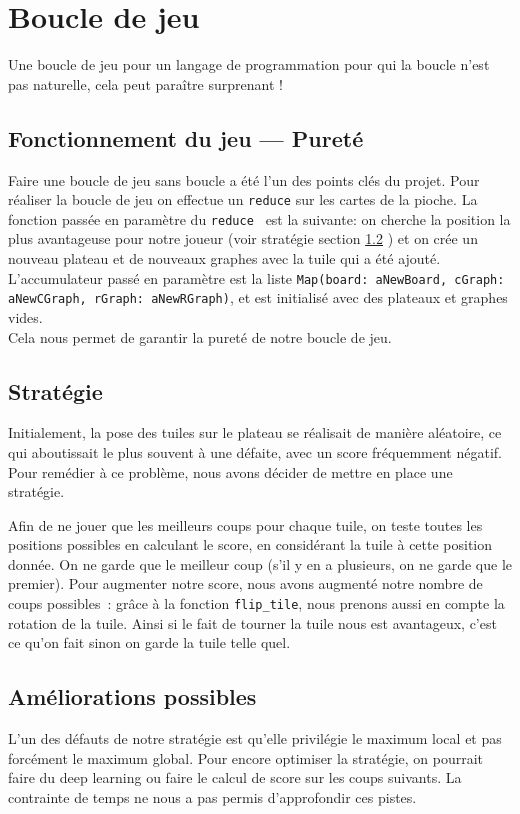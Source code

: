 \section{Boucle de jeu}
Une boucle de jeu pour un langage de programmation pour qui la boucle n'est pas naturelle, cela peut paraître surprenant !

\subsection{Fonctionnement du jeu — Pureté}
Faire une boucle de jeu sans boucle a été l'un des points clés du projet. Pour réaliser la boucle de jeu on effectue un \texttt{reduce} sur les cartes de la pioche. La fonction passée en paramètre du \texttt{reduce } est la suivante: on cherche la position la plus avantageuse pour notre joueur (voir stratégie section \ref{subsec:Strategie} ) et on crée un nouveau plateau et de nouveaux graphes avec la tuile qui a été ajouté. L'accumulateur passé en paramètre est la liste \texttt{Map(board: aNewBoard, cGraph: aNewCGraph, rGraph: aNewRGraph)}, et est initialisé avec des plateaux et graphes vides. \\
Cela nous permet de garantir la pureté de notre boucle de jeu.


\subsection{Stratégie}
\label{subsec:Strategie}
Initialement, la pose des tuiles sur le plateau se réalisait de manière aléatoire, ce qui aboutissait le plus souvent à une défaite, avec un score fréquemment négatif. Pour remédier à ce problème, nous avons décider de mettre en place une stratégie.

Afin de ne jouer que les meilleurs coups pour chaque tuile, on teste toutes les positions possibles en calculant le score, en considérant la tuile à cette position donnée. On ne garde que le meilleur coup (s'il y en a plusieurs, on ne garde que le premier). Pour augmenter notre score, nous avons augmenté notre nombre de coups possibles~: grâce à la fonction \texttt{flip\_tile}, nous prenons aussi en compte la rotation de la tuile. Ainsi si le fait de tourner la tuile nous est avantageux, c'est ce qu'on fait sinon on garde la tuile telle quel. 

\subsection{Améliorations possibles}
L'un des défauts de notre stratégie est qu'elle privilégie le maximum local et pas forcément le maximum global.
Pour encore optimiser la stratégie, on pourrait faire du deep learning ou faire le calcul de score sur les coups suivants. 
La contrainte de temps ne nous a pas permis d'approfondir ces pistes.
